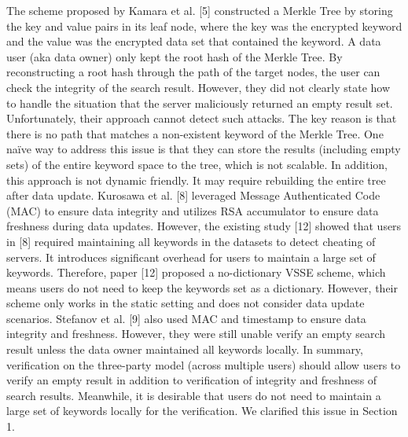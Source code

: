   The scheme proposed by Kamara et al. [5] constructed a Merkle Tree by storing the key and value pairs in its leaf node, where the key was the encrypted keyword and the value was the encrypted data set that contained the keyword. A data user (aka data owner) only kept the root hash of the Merkle Tree. By reconstructing a root hash through the path of the target nodes, the user can check the integrity of the search result. However, they did not clearly state how to handle the situation that the server maliciously returned an empty result set. Unfortunately, their approach cannot detect such attacks. The key reason is that there is no path that matches a non-existent keyword of the Merkle Tree. One naïve way to address this issue is that they can store the results (including empty sets) of the entire keyword space to the tree, which is not scalable. In addition, this approach is not dynamic friendly. It may require rebuilding the entire tree after data update.
  Kurosawa et al. [8] leveraged Message Authenticated Code (MAC) to ensure data integrity and utilizes RSA accumulator to ensure data freshness during data updates. However, the existing study [12] showed that users in [8] required maintaining all keywords in the datasets to detect cheating of servers. It introduces significant overhead for users to maintain a large set of keywords. Therefore, paper [12] proposed a no-dictionary VSSE scheme, which means users do not need to keep the keywords set as a dictionary. However, their scheme only works in the static setting and does not consider data update scenarios.
  Stefanov et al. [9] also used MAC and timestamp to ensure data integrity and freshness. However, they were still unable verify an empty search result unless the data owner maintained all keywords locally.
  In summary, verification on the three-party model (across multiple users) should allow users to verify an empty result in addition to verification of integrity and freshness of search results. Meanwhile, it is desirable that users do not need to maintain a large set of keywords locally for the verification. We clarified this issue in Section 1.




